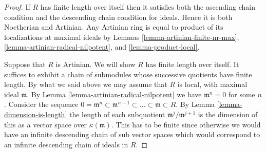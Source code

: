 \begin{proof}
If $R$ has finite length over itself then it satisfies both
the ascending chain condition and the descending chain
condition for ideals. Hence it is both Noetherian and Artinian.
Any Artinian ring is equal to product of its localizations
at maximal ideals by Lemmas \ref{lemma-artinian-finite-nr-max},
\ref{lemma-artinian-radical-nilpotent}, and \ref{lemma-product-local}.

\medskip\noindent
Suppose that $R$ is Artinian. We will show $R$ has finite
length over itself. It suffices to exhibit a chain of
submodules whose successive quotients have finite length.
By what we said above
we may assume that $R$ is local, with maximal ideal $\mathfrak m$.
By Lemma \ref{lemma-artinian-radical-nilpotent} we have
$\mathfrak m^n =0$ for some $n$.
Consider the sequence
$0 = \mathfrak m^n \subset \mathfrak m^{n-1} \subset
\ldots \subset \mathfrak m \subset R$. By Lemma
\ref{lemma-dimension-is-length} the length of each subquotient
$\mathfrak m^j/\mathfrak m^{j + 1}$ is the dimension of this
as a vector space over $\kappa(\mathfrak m)$. This has to be
finite since otherwise we would have an infinite descending
chain of sub vector spaces which would correspond to an
infinite descending chain of ideals in $R$.
\end{proof}









